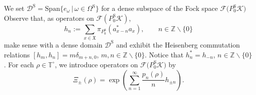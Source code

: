 \documentclass[pdftex]{sigma}
\numberwithin{equation}{section}
\newcommand{\mfrak}[1]{\mathfrak{#1}}
\newcommand{\mcal}[1]{\mathcal{#1}}
\newcommand{\mbb}[1]{\mathbb{#1}}
\newcommand{\mrm}[1]{\mathrm{#1}}
\begin{document}
We set $\mcal{D}^{\mrm{S}}=\mrm{Span}\big\{e_{\omega}\,|\,\omega\in\Omega^{\mrm{S}}\big\}$ for a dense subspace of the Fock space $\mcal{F}\big(P^{\mrm{S}}_{0}\mcal{K}\big)$
Observe that, as operators on $\mcal{F}(P^{\mrm{S}}_{0}\mcal{K})$,
\begin{equation*}
	h_{n}:=\sum_{x\in\mfrak{X}}\pi_{P_{0}^{\mrm{S}}}(a^{\ast}_{x-n}a_{x}),\qquad n\in\mbb{Z}\backslash\{0\}
\end{equation*}
make sense with a dense domain $\mcal{D}^{\mrm{S}}$ and exhibit the Heisenberg commutation relations $[h_{m},h_{n}]=m\delta_{m+n,0}$, $m,n\in\mbb{Z}\backslash\{0\}$.
Notice that $h_{n}^{\ast}=h_{-n}$, $n\in\mbb{Z}\backslash\{0\}$.
For each $\rho\in\mbb{T}^{\circ}$, we introduce operators on $\mcal{F}\big(P^{\mrm{S}}_{0}\mcal{K}\big)$ by
\begin{equation*}
	\Xi _{\pm}(\rho)=\exp\left(\sum_{n=1}^{\infty}\frac{p_{n}(\rho)}{n}h_{\pm n}\right).
\end{equation*}
\end{document}
